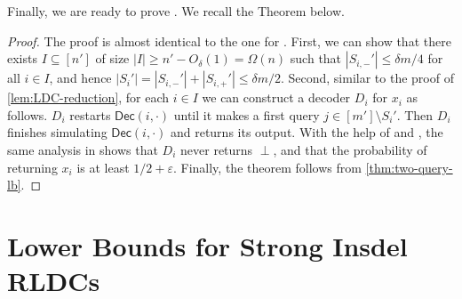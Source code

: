 \documentclass[10pt,a4paper]{article}
\theoremstyle{remark}
\newcommand{\eps}{\ensuremath{\varepsilon}}
\newcommand{\Dec}{\ensuremath{\mathsf{Dec}}\xspace}
\begin{document}
Finally, we are ready to prove . We recall the Theorem below. 
\twoqrldcmain*
\begin{proof}
The proof is almost identical to the one for . First, we can show that there exists $I \subseteq [n']$ of size $|I| \ge n'-O_{\delta}(1) = \Omega(n)$ such that $|S_{i,-}'| \le \delta m/4$ for all $i \in I$, and hence $|S_i'|=|S_{i,-}'|+|S_{i,+}'|\le \delta m/2$. Second, similar to the proof of \cref{lem:LDC-reduction}, for each $i \in I$ we can construct a decoder $D_i$ for $x_i$ as follows. $D_i$ restarts $\Dec(i,\cdot)$ until it makes a first query $j \in [m']\setminus S_i'$. Then $D_i$ finishes simulating $\Dec(i,\cdot)$ and returns its output. With the help of  and , the same analysis in  shows that $D_i$ never returns $\perp$, and that the probability of returning $x_i$ is at least $1/2+\eps$. Finally, the theorem follows from \cref{thm:two-query-lb}. %
\end{proof}

\section{Lower Bounds for Strong Insdel RLDCs}\label{sec:srldc}
\end{document}
